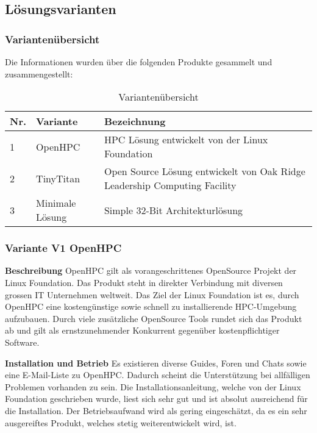 
\subsection{Lösungsvarianten}
\subsubsection{Variantenübersicht}

Die Informationen wurden über die folgenden Produkte gesammelt und zusammengestellt:

\begin{table}[H]
\centering
\begin{tabular}{p{1cm}p{4cm}p{11cm}}
\hline
\rowcolor{heading} \textbf{Nr.} & \textbf{Variante} & \textbf{Bezeichnung} \\\hline
1 & OpenHPC & HPC Lösung entwickelt von der Linux Foundation \\\hline
2 & TinyTitan & Open Source Lösung entwickelt von Oak Ridge Leadership Computing Facility \\\hline
3 & Minimale Lösung & Simple 32-Bit Architekturlösung \\\hline
\end{tabular}
\caption{Variantenübersicht}
\end{table}

\subsubsection{Variante V1 \flqq OpenHPC\frqq}

\textbf{Beschreibung}\newline
OpenHPC gilt als vorangeschrittenes OpenSource Projekt der Linux Foundation. Das Produkt steht in direkter Verbindung mit diversen grossen IT Unternehmen weltweit. Das Ziel der Linux Foundation ist es, durch OpenHPC eine kostengünstige sowie schnell zu installierende HPC-Umgebung aufzubauen. Durch viele zusätzliche OpenSource Tools rundet sich das Produkt ab und gilt als ernstzunehmender Konkurrent gegenüber kostenpflichtiger Software.

\textbf{Installation und Betrieb}\newline
Es existieren diverse Guides, Foren und Chats sowie eine E-Mail-Liste zu OpenHPC. Dadurch scheint die Unterstützung bei allfälligen Problemen vorhanden zu sein. Die Installationsanleitung, welche von der Linux Foundation geschrieben wurde, liest sich sehr gut und ist absolut ausreichend für die Installation. Der Betriebsaufwand wird als gering eingeschätzt, da es ein sehr ausgereiftes Produkt, welches stetig weiterentwickelt wird, ist.

